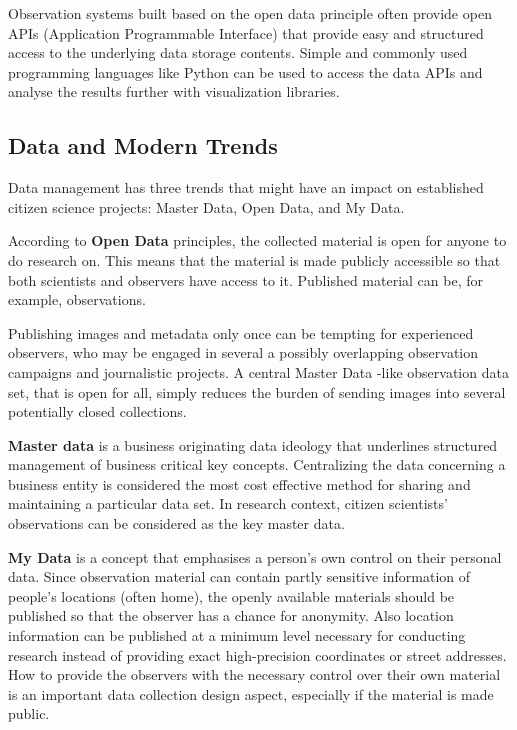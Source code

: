 \documentclass{article}
\begin{document}
Observation systems built based on the open data principle often provide open APIs (Application Programmable Interface) that provide easy and structured access to the underlying data storage contents. Simple and commonly used programming languages like Python can be used to access the data APIs and analyse the results further with visualization libraries.   

\subsection{Data and Modern Trends}\label{sec:data_trend}

Data management has three trends that might have an impact on established citizen science projects: Master Data, Open Data, and My Data.

According to \textbf{Open Data} principles, the collected material is open for anyone to do research on. This means that the material is made publicly accessible so that both scientists and observers have access to it. Published material can be, for example, observations. 

Publishing images and metadata only once can be tempting for experienced observers, who may be engaged in several a possibly overlapping observation campaigns and journalistic projects. A central Master Data -like observation data set, that is open for all, simply reduces the burden of sending images into several potentially closed collections. 

\textbf{Master data} is a business originating data ideology that underlines structured management of business critical key concepts. Centralizing the data concerning a business entity is considered the most cost effective method for sharing and maintaining a particular data set. In research context, citizen scientists' observations can be considered as the key master data.

\textbf{My Data} is a concept that emphasises a person's own control on their personal data. Since observation material can contain partly sensitive information of people's locations (often home), the openly available materials should be published so that the observer has a chance for anonymity. Also location information can be published at a minimum level necessary for conducting research instead of providing exact high-precision coordinates or street addresses. How to provide the observers with the necessary control over their own material is an important data collection design aspect, especially if the material is made public.
\end{document}
